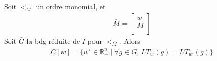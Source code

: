         \begin{prop}
            \label{prop333} Soit $<_M$ un ordre monomial, et
            \begin{align*}
                \bar M =
                \begin{bmatrix}
                    w \\
                    M \\
                \end{bmatrix}
            \end{align*}
            Soit $\bar G$ la bdg réduite de $I$ pour $<_{\bar M}$. Alors
            \begin{align*}
                C[w] = \{w' \in \mathbb{R}_+^n \mid \forall g \in \bar G,\, LT_w(g) = LT_{w'}(g) \}
            \end{align*}
        \end{prop}
